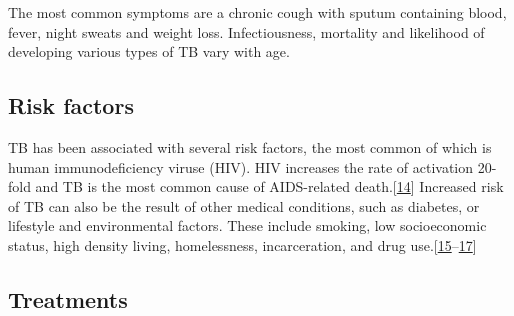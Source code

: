 \documentclass[11pt,twoside]{bristolthesis}
\begin{document}
  The most common symptoms are a chronic cough with sputum containing blood, fever, night sweats and weight loss. Infectiousness, mortality and likelihood of developing various types of TB vary with age.
  
  \hypertarget{risk-factors}{%
  \subsection{Risk factors}\label{risk-factors}}
  
  TB has been associated with several risk factors, the most common of which is human immunodeficiency viruse (HIV). HIV increases the rate of activation 20-fold and TB is the most common cause of AIDS-related death.{[}\protect\hyperlink{ref-Rottenberg2012}{14}{]} Increased risk of TB can also be the result of other medical conditions, such as diabetes, or lifestyle and environmental factors. These include smoking, low socioeconomic status, high density living, homelessness, incarceration, and drug use.{[}\protect\hyperlink{ref-Bhatti1995}{15}--\protect\hyperlink{ref-Story2007}{17}{]}
  
  \hypertarget{treatments}{%
  \subsection{Treatments}\label{treatments}}
  
\end{document}
